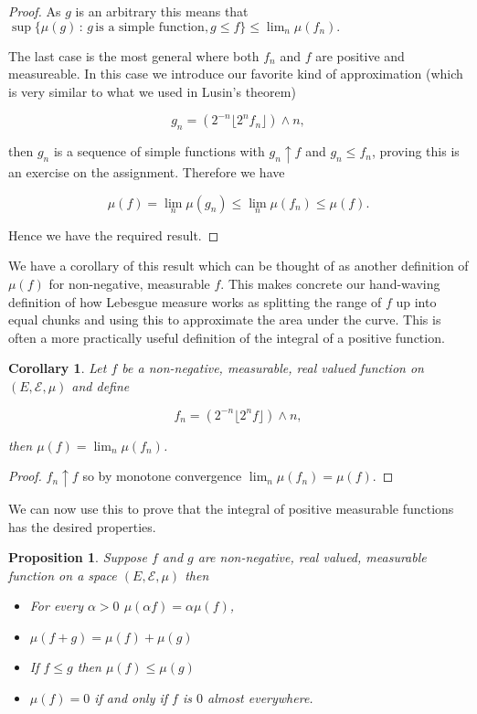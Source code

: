 \documentclass[
]{book}
\providecommand{\tightlist}{%
  \setlength{\itemsep}{0pt}\setlength{\parskip}{0pt}}
\newtheorem{corollary}{Corollary}[chapter]
\newtheorem{proposition}{Proposition}[chapter]
\theoremstyle{definition}
\theoremstyle{definition}
\theoremstyle{definition}
\theoremstyle{definition}
\theoremstyle{remark}
\begin{document}
\begin{proof}
As \(g\) is an arbitrary this means that \(\sup\{\mu(g)\,:\, g \, \mbox{is a simple function}, g \leq f\} \leq \lim_n \mu(f_n).\)

The last case is the most general where both \(f_n\) and \(f\) are positive and measureable. In this case we introduce our favorite kind of approximation (which is very similar to what we used in Lusin's theorem)

\[ g_n = \left( 2^{-n} \lfloor 2^n f_n \rfloor \right) \wedge n, \]

then \(g_n\) is a sequence of simple functions with \(g_n \uparrow f\) and \(g_n \leq f_n\), proving this is an exercise on the assignment. Therefore we have

\[ \mu(f) = \lim_n \mu(g_n) \leq \lim_n \mu(f_n) \leq \mu(f). \]

Hence we have the required result.
\end{proof}

We have a corollary of this result which can be thought of as another definition of \(\mu(f)\) for non-negative, measurable \(f\). This makes concrete our hand-waving definition of how Lebesgue measure works as splitting the range of \(f\) up into equal chunks and using this to approximate the area under the curve. This is often a more practically useful definition of the integral of a positive function.

\begin{corollary}
Let \(f\) be a non-negative, measurable, real valued function on \((E, \mathcal{E}, \mu)\) and define

\[ f_n = \left( 2^{-n} \lfloor 2^n f \rfloor \right) \wedge n, \]

then \(\mu(f) = \lim_n \mu(f_n)\).
\end{corollary}

\begin{proof}
\(f_n \uparrow f\) so by monotone convergence \(\lim_n \mu(f_n) = \mu(f)\).
\end{proof}

We can now use this to prove that the integral of positive measurable functions has the desired properties.

\begin{proposition}

Suppose \(f\) and \(g\) are non-negative, real valued, measurable function on a space \((E, \mathcal{E}, \mu)\) then

\begin{itemize}
\tightlist
\item
  For every \(\alpha>0\) \(\mu(\alpha f) = \alpha \mu(f)\),
\item
  \(\mu(f+g) = \mu(f) + \mu(g)\)
\item
  If \(f \leq g\) then \(\mu(f) \leq \mu(g)\)
\item
  \(\mu(f) = 0\) if and only if \(f\) is \(0\) almost everywhere.
\end{itemize}

\end{proposition}
\end{document}
